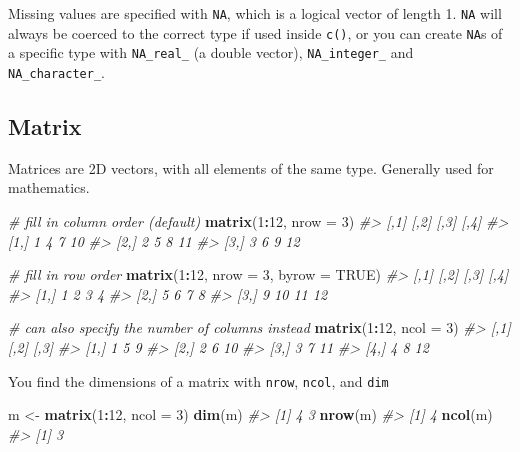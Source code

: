 \documentclass[]{book}
\newenvironment{Shaded}{\begin{snugshade}}{\end{snugshade}}
\newcommand{\CommentTok}[1]{\textcolor[rgb]{0.56,0.35,0.01}{\textit{#1}}}
\newcommand{\DataTypeTok}[1]{\textcolor[rgb]{0.13,0.29,0.53}{#1}}
\newcommand{\DecValTok}[1]{\textcolor[rgb]{0.00,0.00,0.81}{#1}}
\newcommand{\KeywordTok}[1]{\textcolor[rgb]{0.13,0.29,0.53}{\textbf{#1}}}
\newcommand{\NormalTok}[1]{#1}
\newcommand{\OperatorTok}[1]{\textcolor[rgb]{0.81,0.36,0.00}{\textbf{#1}}}
\newcommand{\OtherTok}[1]{\textcolor[rgb]{0.56,0.35,0.01}{#1}}
\newcommand{\StringTok}[1]{\textcolor[rgb]{0.31,0.60,0.02}{#1}}
\theoremstyle{definition}
\theoremstyle{definition}
\theoremstyle{definition}
\theoremstyle{remark}
\begin{document}
Missing values are specified with \texttt{NA}, which is a logical vector
of length 1. \texttt{NA} will always be coerced to the correct type if
used inside \texttt{c()}, or you can create \texttt{NA}s of a specific
type with \texttt{NA\_real\_} (a double vector), \texttt{NA\_integer\_}
and \texttt{NA\_character\_}.

\hypertarget{matrix}{%
\subsection{Matrix}\label{matrix}}

Matrices are 2D vectors, with all elements of the same type. Generally
used for mathematics.

\begin{Shaded}
\begin{Highlighting}[]
\CommentTok{# fill in column order (default)}
\KeywordTok{matrix}\NormalTok{(}\DecValTok{1}\OperatorTok{:}\DecValTok{12}\NormalTok{, }\DataTypeTok{nrow =} \DecValTok{3}\NormalTok{)}
\CommentTok{#>      [,1] [,2] [,3] [,4]}
\CommentTok{#> [1,]    1    4    7   10}
\CommentTok{#> [2,]    2    5    8   11}
\CommentTok{#> [3,]    3    6    9   12}

\CommentTok{# fill in row order}
\KeywordTok{matrix}\NormalTok{(}\DecValTok{1}\OperatorTok{:}\DecValTok{12}\NormalTok{, }\DataTypeTok{nrow =} \DecValTok{3}\NormalTok{, }\DataTypeTok{byrow =} \OtherTok{TRUE}\NormalTok{)}
\CommentTok{#>      [,1] [,2] [,3] [,4]}
\CommentTok{#> [1,]    1    2    3    4}
\CommentTok{#> [2,]    5    6    7    8}
\CommentTok{#> [3,]    9   10   11   12}

\CommentTok{# can also specify the number of columns instead}
\KeywordTok{matrix}\NormalTok{(}\DecValTok{1}\OperatorTok{:}\DecValTok{12}\NormalTok{, }\DataTypeTok{ncol =} \DecValTok{3}\NormalTok{)}
\CommentTok{#>      [,1] [,2] [,3]}
\CommentTok{#> [1,]    1    5    9}
\CommentTok{#> [2,]    2    6   10}
\CommentTok{#> [3,]    3    7   11}
\CommentTok{#> [4,]    4    8   12}
\end{Highlighting}
\end{Shaded}

You find the dimensions of a matrix with \texttt{nrow}, \texttt{ncol},
and \texttt{dim}

\begin{Shaded}
\begin{Highlighting}[]
\NormalTok{m <-}\StringTok{ }\KeywordTok{matrix}\NormalTok{(}\DecValTok{1}\OperatorTok{:}\DecValTok{12}\NormalTok{, }\DataTypeTok{ncol =} \DecValTok{3}\NormalTok{)}
\KeywordTok{dim}\NormalTok{(m)}
\CommentTok{#> [1] 4 3}
\KeywordTok{nrow}\NormalTok{(m)}
\CommentTok{#> [1] 4}
\KeywordTok{ncol}\NormalTok{(m)}
\CommentTok{#> [1] 3}
\end{Highlighting}
\end{Shaded}
\end{document}
